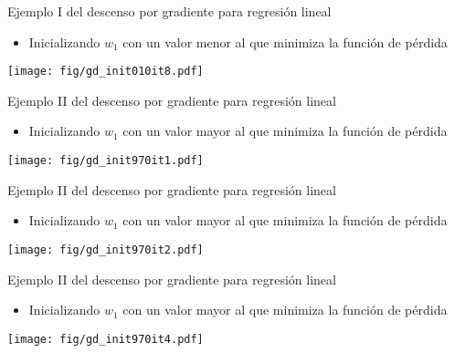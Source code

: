 \documentclass[aspectratio=169,9pt]{beamer}
\begin{document}
\begin{frame}{Ejemplo I del descenso por gradiente para regresión lineal}
\begin{itemize}
	\item Inicializando $w_1$ con un valor menor al que minimiza la función de pérdida
\end{itemize}	
	\begin{center}
		\texttt{[image: fig/gd\_init010it8.pdf]}
	\end{center}
\end{frame}

\begin{frame}{Ejemplo II del descenso por gradiente para regresión lineal}
\begin{itemize}
	\item Inicializando $w_1$ con un valor mayor al que minimiza la función de pérdida
\end{itemize}
\begin{center}
	\texttt{[image: fig/gd\_init970it1.pdf]}
\end{center}
\end{frame}

\begin{frame}{Ejemplo II del descenso por gradiente para regresión lineal}
\begin{itemize}
	\item Inicializando $w_1$ con un valor mayor al que minimiza la función de pérdida
\end{itemize}
\begin{center}
	\texttt{[image: fig/gd\_init970it2.pdf]}
\end{center}
\end{frame}

\begin{frame}{Ejemplo II del descenso por gradiente para regresión lineal}
\begin{itemize}
	\item Inicializando $w_1$ con un valor mayor al que minimiza la función de pérdida
\end{itemize}
\begin{center}
	\texttt{[image: fig/gd\_init970it4.pdf]}
\end{center}
\end{frame}
\end{document}
